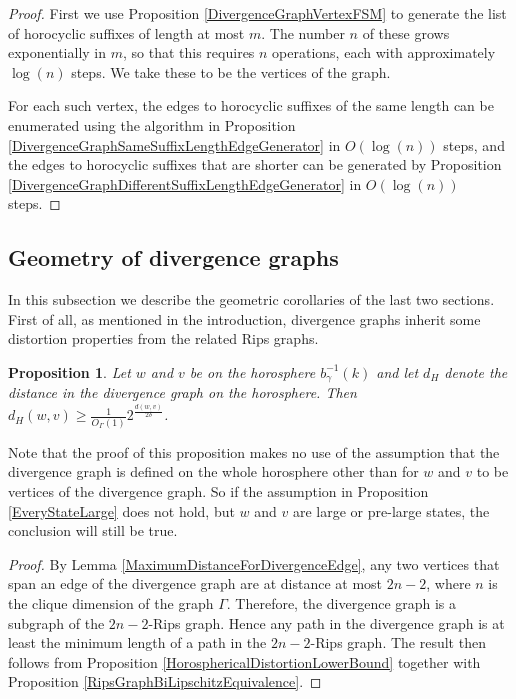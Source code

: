 \documentclass[10pt,a4paper]{amsart}
\newtheorem{proposition}[theorem]{Proposition}
\theoremstyle{definition}
\theoremstyle{remark}
\begin{document}
	\begin{proof}
		
		First we use Proposition \ref{DivergenceGraphVertexFSM} to generate the list of horocyclic suffixes of length at most $m$. The number $n$ of these grows exponentially in $m$, so that this requires $n$ operations, each with approximately $\log(n)$ steps. We take these to be the vertices of the graph.
		
		For each such vertex, the edges to horocyclic suffixes of the same length can be enumerated using the algorithm in Proposition \ref {DivergenceGraphSameSuffixLengthEdgeGenerator} in $O(\log(n))$ steps, and the edges to horocyclic suffixes that are shorter can be generated by Proposition \ref{DivergenceGraphDifferentSuffixLengthEdgeGenerator} in $O(\log(n))$ steps. 
	\end{proof}
	
	\subsection{Geometry of divergence graphs}
	\label{subsec:DivergenceGraphGeometry}
	
	In this subsection we describe the geometric corollaries of the last two sections. First of all, as mentioned in the introduction, divergence graphs inherit some distortion properties from the related Rips graphs.
	
	\begin{proposition}
		
		Let $w$ and $v$ be on the horosphere $b_{\gamma}^{-1}(k)$ and let $d_H$ denote the distance in the divergence graph on the horosphere. Then $d_H(w, v)\ge \frac{1}{O_\Gamma(1)}2^{\frac{d(w, v)}{2\delta}}$.
		
	\end{proposition}
	
	Note that the proof of this proposition makes no use of the assumption that the divergence graph is defined on the whole horosphere other than for $w$ and $v$ to be vertices of the divergence graph. So if the assumption in Proposition \ref{EveryStateLarge} does not hold, but $w$ and $v$ are large or pre-large states, the conclusion will still be true.
	
	\begin{proof}
		
		By Lemma \ref{MaximumDistanceForDivergenceEdge}, any two vertices that span an edge of the divergence graph are at distance at most $2n-2$, where $n$ is the clique dimension of the graph $\Gamma$. Therefore, the divergence graph is a subgraph of the $2n-2$-Rips graph. Hence any path in the divergence graph is at least the minimum length of a path in the $2n-2$-Rips graph. The result then follows from Proposition \ref{HorosphericalDistortionLowerBound} together with Proposition \ref{RipsGraphBiLipschitzEquivalence}.
	\end{proof}
	
\end{document}
